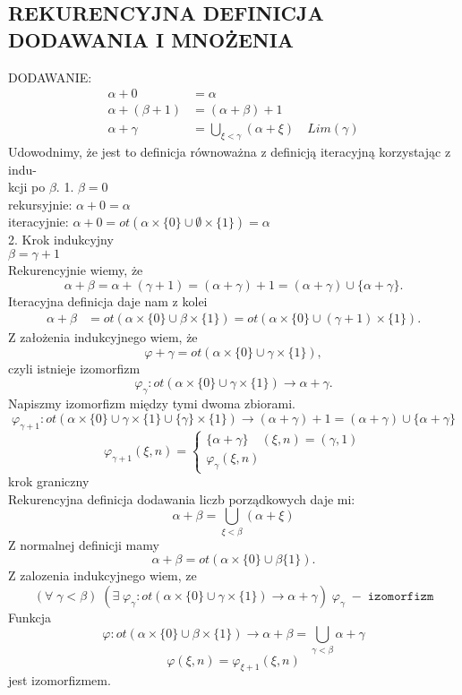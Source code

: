 \subsection{REKURENCYJNA DEFINICJA DODAWANIA I MNOŻENIA}
{\large\color{def}DODAWANIE}:
\begin{align*}
    \alpha+0 &= \alpha\\
    \alpha+(\beta+1)&=(\alpha+\beta)+1\\
    \alpha+\gamma&=\bigcup\limits_{\xi<\gamma}(\alpha+\xi)\quad Lim(\gamma)
\end{align*}
\dowod
Udowodnimy, że jest to definicja równoważna z definicją iteracyjną korzystając z indu-\\kcji po $\beta$.
1. $\beta = 0$\smallskip\\
rekursyjnie: $\alpha+0=\alpha$\smallskip\\
iteracyjnie: $\alpha+0=ot(\alpha\times\{0\}\cup\emptyset\times\{1\})=\alpha$\medskip\\
2. Krok indukcyjny\medskip\\
 $\beta=\gamma+1$\smallskip\\
Rekurencyjnie wiemy, że 
$$\alpha+\beta=\alpha+(\gamma+1)=(\alpha+\gamma)+1=(\alpha+\gamma)\cup\{\alpha+\gamma\}.$$
Iteracyjna definicja daje nam z kolei
\begin{align*}
    \alpha+\beta&=ot(\alpha\times\{0\}\cup\beta\times\{1\})=ot(\alpha\times\{0\}\cup(\gamma+1)\times\{1\}).
\end{align*}
Z założenia indukcyjnego wiem, że
$$\varphi+\gamma=ot(\alpha\times\{0\}\cup\gamma\times\{1\}),$$
czyli istnieje izomorfizm 
$$\varphi_\gamma:ot(\alpha\times\{0\}\cup\gamma\times\{1\})\to \alpha+\gamma.$$
Napiszmy izomorfizm między tymi dwoma zbiorami. 
$$\varphi_{\gamma+1}:ot(\alpha\times\{0\}\cup\gamma\times\{1\}\cup\{\gamma\}\times\{1\})\to(\alpha+\gamma)+1=(\alpha+\gamma)\cup\{\alpha+\gamma\}$$
$$\varphi_{\gamma+1}(\xi, n)=\begin{cases}\{\alpha+\gamma\}\quad (\xi, n) = (\gamma, 1)\\ \varphi_\gamma(\xi, n)\end{cases}$$
{\color{acc}krok graniczny}\smallskip\\
Rekurencyjna definicja dodawania liczb porządkowych daje mi:
$$\alpha+\beta=\bigcup\limits_{\xi<\beta}(\alpha+\xi)$$
Z normalnej definicji mamy
$$\alpha+\beta=ot(\alpha\times\{0\}\cup\beta\{1\}).$$
Z zalozenia indukcyjnego wiem, ze
$$(\forall\;\gamma<\beta)\;(\exists\;\varphi_\gamma:ot(\alpha\times\{0\}\cup\gamma\times\{1\})\to\alpha+\gamma)\;\varphi_\gamma\;-\;\texttt{izomorfizm}$$
Funkcja
$$\varphi:ot(\alpha\times\{0\}\cup\beta\times\{1\})\to\alpha+\beta=\bigcup\limits_{\gamma<\beta}\alpha+\gamma$$
$$\varphi(\xi, n)= \varphi_{\xi+1}(\xi, n)$$
jest izomorfizmem.\bigskip  

